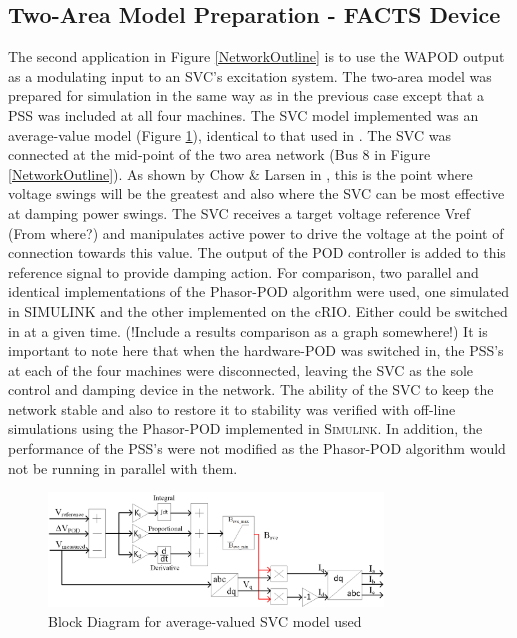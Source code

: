 \documentclass[journal]{IEEEtran}
\begin{document}



\subsection{Two-Area Model Preparation - FACTS Device}

The second application in Figure \ref{NetworkOutline} is to use the WAPOD output as a modulating input to an SVC's excitation system. The two-area model was prepared for simulation in the same way as in the previous case except that a PSS was included at all four machines. The SVC model implemented was an average-value model (Figure \ref{SVC_Model}), identical to that used in \cite{PhasorPODImplement}. The SVC was connected at the mid-point of the two area network (Bus 8 in Figure \ref{NetworkOutline}). As shown by Chow \& Larsen in \cite{sVARdamp}, this is the point where voltage swings will be the greatest and also where the SVC can be most effective at damping power swings. The SVC receives a target voltage reference Vref (From where?) and manipulates active power to drive the voltage at the point of connection towards this value. The output of the POD controller is added to this reference signal to provide damping action. For comparison, two parallel and identical implementations of the Phasor-POD algorithm were used, one simulated in SIMULINK and the other implemented on the cRIO. Either could be switched in at a given time. (!Include a results comparison as a graph somewhere!) It is important to note here that when the hardware-POD was switched in, the PSS's at each of the four machines were disconnected, leaving the SVC as the sole control and damping device in the network. The ability of the SVC to keep the network stable and also to restore it to stability was verified with off-line simulations using the Phasor-POD implemented in \textsc{Simulink}. In addition, the performance of the PSS's were not modified as the Phasor-POD algorithm would not be running in parallel with them.

\begin{figure}[!th]
\centering
\includegraphics[width=3.5in]{SVC_AverageModel.png}
\caption{Block Diagram for average-valued SVC model used}
\label{SVC_Model}
\end{figure}
\vspace{-0.7em}
\end{document}
